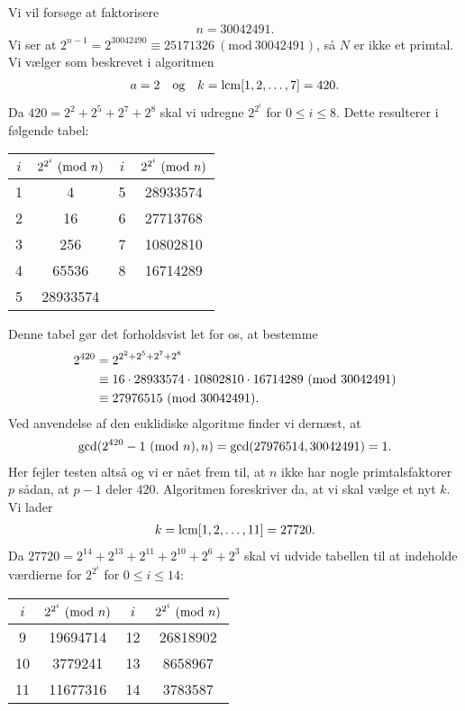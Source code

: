 \begin{example}
Vi vil forsøge at faktorisere 
\begin{align*}
	n = 30042491.
\end{align*}
Vi ser at $2^{n-1} = 2^{30042490} \equiv 25171326 \ (\textrm{mod}\ 30042491)$,
så $N$ er ikke et primtal. Vi vælger som beskrevet i algoritmen
\begin{align*}
	a = 2 \quad \text{og} \quad k = \mathrm{lcm}[1,2, \ldots, 7] = 420.
\end{align*}
Da $420 = 2^2 + 2^5 + 2^7 + 2^8$ skal vi udregne $2^{2^i}$ for 
$0 \leq i \leq 8$. Dette resulterer i følgende tabel:

\begin{center}
\begin{tabular}{c c c c}
$i$ & $2^{2^i} \ (\mathrm{mod} \ n)$ & $i$ & $2^{2^i} \ (\mathrm{mod} \ n)$ \\ 
\hline 
1 & 4 & 5 & 28933574 \\ 
2 & 16 & 6 & 27713768 \\ 
3 & 256 & 7 & 10802810 \\ 
4 & 65536 & 8 & 16714289 \\ 
5 & 28933574 & & 
\end{tabular} 
\end{center}
Denne tabel gør det forholdsvist let for os, at bestemme
\begin{align*}
	2^{420} &= 2^{2^2 + 2^5 + 2^7 + 2^8} \\
	&\equiv 16 \cdot 28933574 \cdot 10802810 \cdot 16714289
	\ (\mathrm{mod} \ 30042491) \\
	&\equiv 27976515 \ (\mathrm{mod} \ 30042491).
\end{align*}
Ved anvendelse af den euklidiske algoritme finder vi dernæst, at
\begin{align*}
	\mathrm{gcd}(2^{420} - 1 \ (\mathrm{mod} \ n), n) = \mathrm{gcd}(27976514, 30042491) = 1.
\end{align*}
Her fejler testen altså og vi er nået frem til, at $n$ ikke har nogle 
primtalsfaktorer $p$ sådan, at $p-1$ deler $420$. Algoritmen foreskriver da, at vi skal vælge et nyt $k$. Vi lader
\begin{align*}
	k = \mathrm{lcm}[1,2, \ldots, 11] = 27720.
\end{align*}
Da $27720 = 2^{14} + 2^{13} + 2^{11} + 2^{10} + 2^{6} + 2^3$ skal vi udvide tabellen til at indeholde værdierne for $2^{2^i}$ for $0 \leq i \leq 14$:

\begin{center}
\begin{tabular}{c c c c}
$i$ & $2^{2^i} \ (\mathrm{mod} \ n)$ & $i$ & $2^{2^i} \ (\mathrm{mod} \ n)$ \\ 
\hline 
9 & 19694714 & 12 & 26818902 \\ 
10 & 3779241 & 13 & 8658967 \\ 
11 & 11677316 & 14 & 3783587 \\ 
\end{tabular} 
\end{center}


\end{example}
